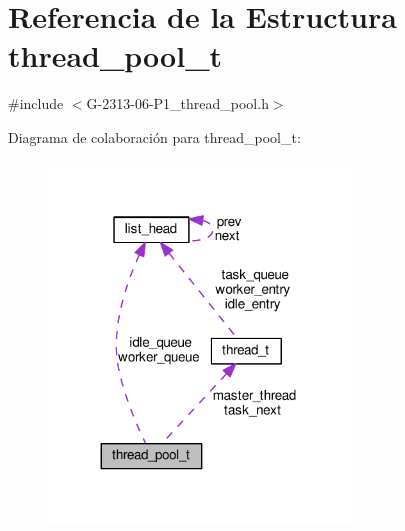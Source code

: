 \hypertarget{structthread__pool__t}{}\section{Referencia de la Estructura thread\+\_\+pool\+\_\+t}
\label{structthread__pool__t}


{\ttfamily \#include $<$G-\/2313-\/06-\/\+P1\+\_\+thread\+\_\+pool.\+h$>$}



Diagrama de colaboración para thread\+\_\+pool\+\_\+t\+:\nopagebreak
\begin{figure}[H]
\begin{center}
\leavevmode
\includegraphics[width=227pt]{structthread__pool__t__coll__graph}
\end{center}
\end{figure}
